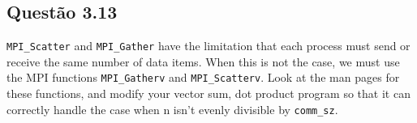 

\subsection{Questão 3.13}

\texttt{MPI\_Scatter} and \texttt{MPI\_Gather} have the limitation that each process must send or receive the same number of data items. When this is not the case, we must use the MPI functions \texttt{MPI\_Gatherv} and \texttt{MPI\_Scatterv}. Look at the man pages for these functions, and modify your vector sum, dot product program so that it can correctly handle the case when n isn’t evenly divisible by \texttt{comm\_sz}.



